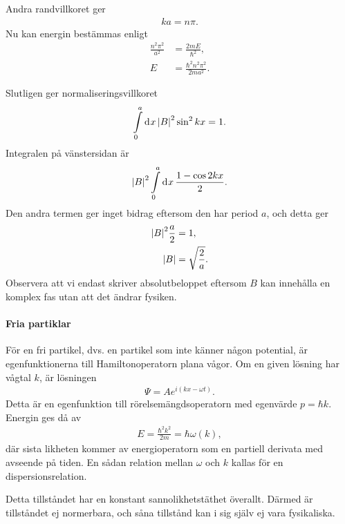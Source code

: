 Andra randvillkoret ger
\begin{align*}
	ka = n\pi.
\end{align*}
Nu kan energin bestämmas enligt
\begin{align*}
	\frac{n^{2}\pi^{2}}{a^{2}} &= \frac{2mE}{\hbar^{2}}, \\
	E                          &= \frac{\hbar^{2}n^{2}\pi^{2}}{2ma^{2}}.
\end{align*}

Slutligen ger normaliseringsvillkoret
\begin{align*}
	\int\limits_{0}^{a}\dd[]{x}\abs{B}^{2}\sin^{2}{kx} = 1.
\end{align*}
Integralen på vänstersidan är
\begin{align*}
	\abs{B}^{2}\int\limits_{0}^{a}\dd[]{x}\frac{1 - \cos{2kx}}{2}.
\end{align*}
Den andra termen ger inget bidrag eftersom den har period $a$, och detta ger
\begin{align*}
	\abs{B}^{2}\frac{a}{2} &= 1, \\
	\abs{B}                &= \sqrt{\frac{2}{a}}.
\end{align*}
Observera att vi endast skriver absolutbeloppet eftersom $B$ kan innehålla en komplex fas utan att det ändrar fysiken.

\paragraph{Fria partiklar}
För en fri partikel, dvs. en partikel som inte känner någon potential, är egenfunktionerna till Hamiltonoperatorn plana vågor. Om en given lösning har vågtal $k$, är lösningen
\begin{align*}
	\Psi = Ae^{i(kx - \omega t)}.
\end{align*}
Detta är en egenfunktion till rörelsemängdsoperatorn med egenvärde $p = \hbar k$. Energin ges då av
\begin{align*}
	E = \frac{\hbar^{2}k^{2}}{2m} = \hbar\omega(k),
\end{align*}
där sista likheten kommer av energioperatorn som en partiell derivata med avseende på tiden. En sådan relation mellan $\omega$ och $k$ kallas för en dispersionsrelation.

Detta tillståndet har en konstant sannolikhetstäthet överallt. Därmed är tillståndet ej normerbara, och såna tillstånd kan i sig själv ej vara fysikaliska.

